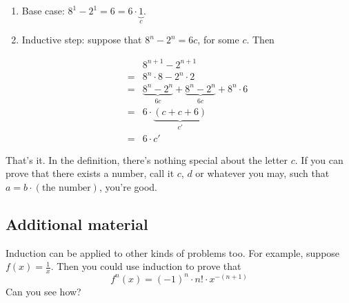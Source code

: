 \documentclass{scrreprt}
\begin{document}
\begin{enumerate}
    \item Base case: $8^1 - 2^1 = 6 = 6 \cdot \underbrace{1}_{c}$.
    \item Inductive step: suppose that $8^n - 2^n = 6c$, for some $c$. Then
    
    \begin{align*}
        & 8^{n + 1} - 2^{n + 1} \\
        =& 8^n \cdot 8 - 2^n \cdot 2 \\
        =& \underbrace{8^n - 2^n}_{6c} + \underbrace{8^n - 2^n}_{6c} + 8^n \cdot 6 \\
        =& 6 \cdot \underbrace{(c + c + 6)}_{c'} \\
        =& 6 \cdot c'
    \end{align*}
\end{enumerate}
That's it. In the definition, there's nothing special about the letter $c$. If you can prove that there exists a number, call it $c$, $d$ or whatever you may, such that $a = b \cdot (\text{the number})$, you're good.

\subsection*{Additional material}
Induction can be applied to other kinds of problems too. For example, suppose $f(x) = \frac{1}{x}$. Then you could use induction to prove that $$f^n(x) = (-1)^n \cdot n! \cdot x^{-(n + 1)}$$ Can you see how?
\end{document}
